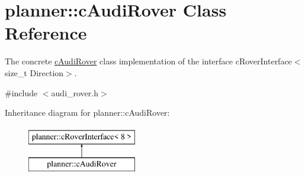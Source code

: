 \hypertarget{classplanner_1_1c_audi_rover}{}\section{planner\+:\+:c\+Audi\+Rover Class Reference}
\label{classplanner_1_1c_audi_rover}


The concrete \mbox{\hyperlink{classplanner_1_1c_audi_rover}{c\+Audi\+Rover}} class implementation of the interface c\+Rover\+Interface$<$size\+\_\+t Direction$>$.  




{\ttfamily \#include $<$audi\+\_\+rover.\+h$>$}

Inheritance diagram for planner\+:\+:c\+Audi\+Rover\+:\begin{figure}[H]
\begin{center}
\leavevmode
\includegraphics[height=2.000000cm]{classplanner_1_1c_audi_rover}
\end{center}
\end{figure}
